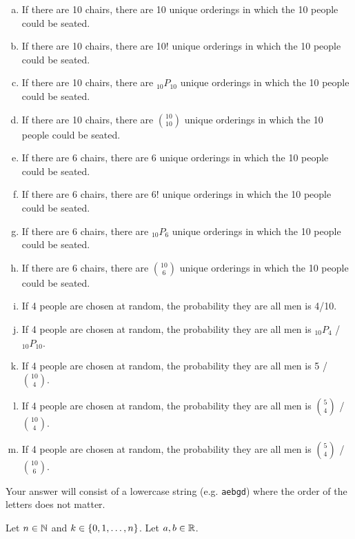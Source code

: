 \documentclass[12pt,landscape]{article}
\newcommand{\instr}{\small Your answer will consist of a lowercase string (e.g. \texttt{aebgd}) where the order of the letters does not matter. \normalsize}
\begin{document}
\vspace{-0.2cm}\benum{} 
\begin{enumerate}[(a)]
\item If there are 10 chairs, there are 10 unique orderings in which the 10 people could be seated.
\item If there are 10 chairs, there are 10! unique orderings in which the 10 people could be seated.
\item If there are 10 chairs, there are $_{10} P_{10}$ unique orderings in which the 10 people could be seated.
\item If there are 10 chairs, there are $\binom{10}{10}$ unique orderings in which the 10 people could be seated.

\item If there are 6 chairs, there are 6 unique orderings in which the 10 people could be seated.
\item If there are 6 chairs, there are 6! unique orderings in which the 10 people could be seated.
\item If there are 6 chairs, there are $_{10} P_{6}$ unique orderings in which the 10 people could be seated.
\item If there are 6 chairs, there are $\binom{10}{6}$ unique orderings in which the 10 people could be seated.

\item If 4 people are chosen at random, the probability they are all men is 4/10.
\item If 4 people are chosen at random, the probability they are all men is $_{10} P_{4}$ / $_{10} P_{10}$.
\item If 4 people are chosen at random, the probability they are all men is 5 / $\binom{10}{4}$.
\item If 4 people are chosen at random, the probability they are all men is $\binom{5}{4}$ / $\binom{10}{4}$.
\item If 4 people are chosen at random, the probability they are all men is $\binom{5}{4}$ / $\binom{10}{6}$.
\end{enumerate}
\eenum\instr\pagebreak

\problem{} Let $n \in \mathbb{N}$ and $k \in \left\{0, 1, \ldots, n\right\}$. Let $a, b \in \mathbb{R}$.
\end{document}
